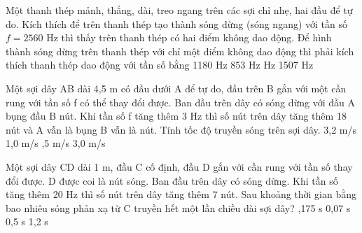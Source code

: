 \begin{ex}%
Một thanh thép mảnh, thẳng, dài, treo ngang trên các sợi chỉ nhẹ, hai đầu để tự do. Kích thích để trên thanh thép tạo thành sóng dừng (sóng ngang) với tần số $f=2560$ Hz thì thấy trên thanh thép có hai điểm không dao động. Để hình thành sóng dừng trên thanh thép với chỉ một điểm không dao động thì phải kích thích thanh thép dao động với tần số bằng
\choice
{1180 Hz}
{853 Hz}
{ Hz}
{1507 Hz}
\end{ex} 

\begin{ex}%
Một sợi dây AB dài 4,5 m có đầu dưới A để tự do, đầu trên B gắn với một cần rung với tần số f có thể thay đổi được. Ban đầu trên dây có sóng dừng với đầu A bụng đầu B nút. Khi tần số f tăng thêm 3 Hz thì số nút trên dây tăng thêm 18 nút và A vẫn là bụng B vẫn là nút. Tính tốc độ truyền sóng trên sợi dây.
\choice
{3,2 m/s}
{1,0 m/s}
{,5 m/s}
{3,0 m/s}
\end{ex} 
\begin{ex}%
Một sợi dây CD dài 1 m, đầu C cố định, đầu D gắn với cần rung với tần số thay đổi được. D được coi là nút sóng. Ban đầu trên dây có sóng dừng. Khi tần số tăng thêm 20 Hz thì số nút trên dây tăng thêm 7 nút. Sau khoảng thời gian bằng bao nhiêu sóng phản xạ từ C truyền hết một lần chiều dài sợi dây?
\choice
{,175 s}
{0,07 s}
{0,5 s}
{1,2 s}
\end{ex} 

